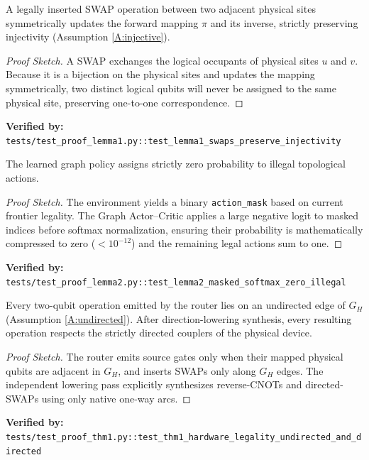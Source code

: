 \begin{lemma}
A legally inserted SWAP operation between two adjacent physical sites symmetrically updates the forward mapping $\pi$ and its inverse, strictly preserving injectivity (Assumption \ref{A:injective}).
\end{lemma}
\begin{proof}[Proof Sketch]
A SWAP exchanges the logical occupants of physical sites $u$ and $v$. Because it is a bijection on the physical sites and updates the mapping symmetrically, two distinct logical qubits will never be assigned to the same physical site, preserving one-to-one correspondence.
\end{proof}
\noindent \textbf{Verified by:} \texttt{tests/test\_proof\_lemma1.py::test\_lemma1\_swaps\_preserve\_injectivity}

\begin{lemma}
The learned graph policy assigns strictly zero probability to illegal topological actions.
\end{lemma}
\begin{proof}[Proof Sketch]
The environment yields a binary \texttt{action\_mask} based on current frontier legality. The Graph Actor--Critic applies a large negative logit to masked indices before softmax normalization, ensuring their probability is mathematically compressed to zero ($<10^{-12}$) and the remaining legal actions sum to one.
\end{proof}
\noindent \textbf{Verified by:} \texttt{tests/test\_proof\_lemma2.py::test\_lemma2\_masked\_softmax\_zero\_illegal}

\begin{theorem}
Every two-qubit operation emitted by the router lies on an undirected edge of $G_H$ (Assumption \ref{A:undirected}). After direction-lowering synthesis, every resulting operation respects the strictly directed couplers of the physical device.
\end{theorem}
\begin{proof}[Proof Sketch]
The router emits source gates only when their mapped physical qubits are adjacent in $G_H$, and inserts SWAPs only along $G_H$ edges. The independent lowering pass explicitly synthesizes reverse-CNOTs and directed-SWAPs using only native one-way arcs.
\end{proof}
\noindent \textbf{Verified by:} \texttt{tests/test\_proof\_thm1.py::test\_thm1\_hardware\_legality\_undirected\_and\_directed}

